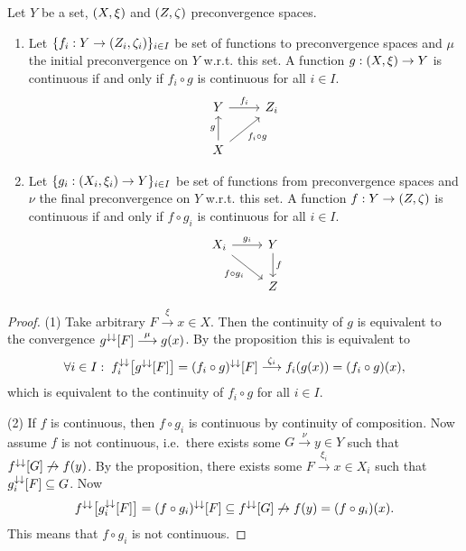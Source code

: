 \begin{corollary} \label{characteristicPropertyInitialFinalConvergence}
Let $Y$ be a set, $\left( X,\xi \right)$ and $\left( Z, \zeta \right)$ preconvergence spaces.
\begin{enumerate}
\item Let $\{f_i: Y\to \left( Z_i, \zeta_i \right)\}_{i\in I}$ be set of functions to preconvergence spaces and $\mu$ the initial preconvergence on $Y$ w.r.t. this set. A function $g: \left( X, \xi \right)\to Y$ is continuous \textup{if and only if} $f_i \circ g$ is continuous for all $i\in I$.
\[ \begin{tikzcd}
Y \ar[r, "f_i"] & Z_i \\ X \ar[u, "g"] \ar[ur, swap, "f_i\circ g"]
\end{tikzcd} \]
\item Let $\{g_i: \left( X_i, \xi_i \right) \to Y\}_{i\in I}$ be set of functions from preconvergence spaces and $\nu$ the final preconvergence on $Y$ w.r.t. this set. A function $f: Y\to \left( Z,\zeta \right)$ is continuous \textup{if and only if} $f\circ g_i$ is continuous for all $i\in I$.
\[ \begin{tikzcd}
X_i \ar[r, "g_i"] \ar[dr, swap, "f\circ g_i"] & Y \ar[d, "f"] \\ & Z
\end{tikzcd} \]
\end{enumerate}
\end{corollary}
\begin{proof}
(1) Take arbitrary $F\overset{\xi}{\longrightarrow} x\in X$. Then the continuity of $g$ is equivalent to the convergence $g^{\downarrow\downarrow}[F] \overset{\mu}{\longrightarrow} g(x)$. By the proposition this is equivalent to
\[ \forall i \in I: \; f_i^{\downarrow\downarrow}\big[g^{\downarrow\downarrow}[F]\big] = (f_i\circ g)^{\downarrow\downarrow}[F] \overset{\zeta_i}{\longrightarrow} f_i(g(x)) = (f_i\circ g)(x),  \]
which is equivalent to the continuity of $f_i\circ g$ for all $i\in I$.

(2) If $f$ is continuous, then $f\circ g_i$ is continuous by continuity of composition. Now assume $f$ is not continuous, i.e.\ there exists some $G\overset{\nu}{\longrightarrow} y\in Y$ such that $f^{\downarrow\downarrow}[G] \not\to f(y)$. By the proposition, there exists some $F\overset{\xi_i}{\longrightarrow} x\in X_i$ such that $g_i^{\downarrow\downarrow}[F] \subseteq G$. Now
\[ f^{\downarrow\downarrow}\big[g_i^{\downarrow\downarrow}[F]\big] = (f\circ g_i)^{\downarrow\downarrow}[F] \subseteq f^{\downarrow\downarrow}[G] \not\to f(y) = (f\circ g_i)(x). \]
This means that $f\circ g_i$ is not continuous.
\end{proof}


